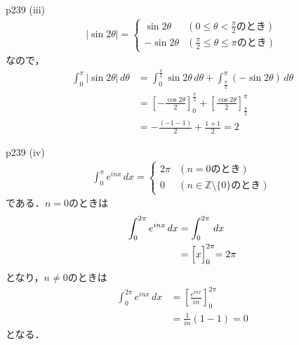 \documentclass[dvipdfmx,uplatex,11pt]{jsarticle}
\theoremstyle{definition}
\begin{document}
\begin{screen}
	p239 (iii) 
	\begin{align*}
		|\sin 2 \theta| =
		\begin{cases}
			\sin 2 \theta & (0 \le \theta < \frac{\pi}{2} のとき)\\
			- \sin 2 \theta & (\frac{\pi}{2}\le \theta \le \pi のとき)
		\end{cases}
	\end{align*}
		なので，
		\begin{align*}
			\int_{0}^{\pi} |\sin 2 \theta| \, d \theta & = \int_{0}^{\frac{\pi}{2}} \sin 2 \theta \, d \theta +\int_{\frac{\pi}{2}}^{\pi} (-\sin 2 \theta) \, d \theta \\
			&= \left [-\frac{\cos 2 \theta}{2}\right]_{0}^{\frac{\pi}{2}} + \left [\frac{\cos 2 \theta}{2}\right]_{\frac{\pi}{2}}^{\pi} \\
			& = -\frac{(-1-1)}{2} + \frac{1+1}{2} = 2
		\end{align*}
	\end{screen}

	\begin{screen}
		p239 (iv) 
		\begin{align*}
			\int_{0}^{\pi} e^{inx} \, dx  =
			\begin{cases}
				2 \pi & (n=0 のとき) \\
				0 & (n \in \mathbb{Z}\setminus \{0\} のとき)
			\end{cases}
		\end{align*}
		である．$n=0$のときは
		\begin{align*}
			\int_{0}^{2 \pi} e^{inx} \, dx & = \int_{0}^{2\pi} \, dx \\
			& = \Bigl[x\Bigl]_{0}^{2\pi} = 2\pi
		\end{align*}
		となり，$n \ne 0$のときは
		\begin{align*}
			\int_{0}^{2\pi} e^{inx} \, dx & = \left [\frac{e^{inx}}{in} \right ]_{0}^{2\pi} \\
			& = \frac{1}{in} (1-1)=0
		\end{align*}
		となる．
	\end{screen}
\end{document}
